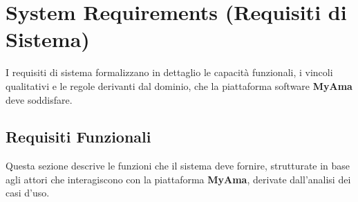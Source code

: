 \section{System Requirements (Requisiti di Sistema)}

I requisiti di sistema formalizzano in dettaglio le capacità funzionali, i vincoli qualitativi e le regole derivanti dal dominio, che la piattaforma software \textbf{MyAma} deve soddisfare.

\subsection{Requisiti Funzionali}
Questa sezione descrive le funzioni che il sistema deve fornire, strutturate in base agli attori che interagiscono con la piattaforma \textbf{MyAma}, derivate dall'analisi dei casi d'uso.

